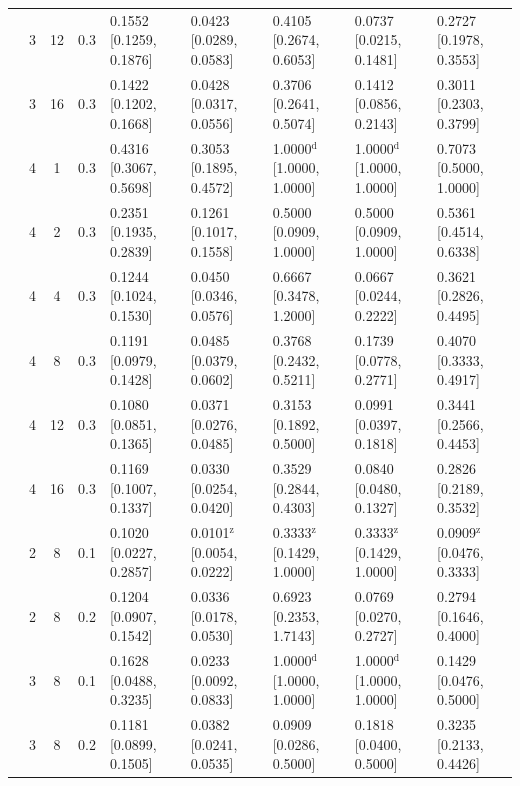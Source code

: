 \begin{tabular}{@{}cccclllll@{}}
 & 3 & 12 & 0.3 & 0.1552 {\tiny[0.1259, 0.1876]} & 0.0423 {\tiny[0.0289, 0.0583]} & 0.4105 {\tiny[0.2674, 0.6053]} & 0.0737 {\tiny[0.0215, 0.1481]} & 0.2727 {\tiny[0.1978, 0.3553]} \\
 & 3 & 16 & 0.3 & 0.1422 {\tiny[0.1202, 0.1668]} & 0.0428 {\tiny[0.0317, 0.0556]} & 0.3706 {\tiny[0.2641, 0.5074]} & 0.1412 {\tiny[0.0856, 0.2143]} & 0.3011 {\tiny[0.2303, 0.3799]} \\
 & 4 & 1 & 0.3 & 0.4316 {\tiny[0.3067, 0.5698]} & 0.3053 {\tiny[0.1895, 0.4572]} & 1.0000$^{\mathrm{d}}$ {\tiny[1.0000, 1.0000]} & 1.0000$^{\mathrm{d}}$ {\tiny[1.0000, 1.0000]} & 0.7073 {\tiny[0.5000, 1.0000]} \\
 & 4 & 2 & 0.3 & 0.2351 {\tiny[0.1935, 0.2839]} & 0.1261 {\tiny[0.1017, 0.1558]} & 0.5000 {\tiny[0.0909, 1.0000]} & 0.5000 {\tiny[0.0909, 1.0000]} & 0.5361 {\tiny[0.4514, 0.6338]} \\
 & 4 & 4 & 0.3 & 0.1244 {\tiny[0.1024, 0.1530]} & 0.0450 {\tiny[0.0346, 0.0576]} & 0.6667 {\tiny[0.3478, 1.2000]} & 0.0667 {\tiny[0.0244, 0.2222]} & 0.3621 {\tiny[0.2826, 0.4495]} \\
 & 4 & 8 & 0.3 & 0.1191 {\tiny[0.0979, 0.1428]} & 0.0485 {\tiny[0.0379, 0.0602]} & 0.3768 {\tiny[0.2432, 0.5211]} & 0.1739 {\tiny[0.0778, 0.2771]} & 0.4070 {\tiny[0.3333, 0.4917]} \\
 & 4 & 12 & 0.3 & 0.1080 {\tiny[0.0851, 0.1365]} & 0.0371 {\tiny[0.0276, 0.0485]} & 0.3153 {\tiny[0.1892, 0.5000]} & 0.0991 {\tiny[0.0397, 0.1818]} & 0.3441 {\tiny[0.2566, 0.4453]} \\
 & 4 & 16 & 0.3 & 0.1169 {\tiny[0.1007, 0.1337]} & 0.0330 {\tiny[0.0254, 0.0420]} & 0.3529 {\tiny[0.2844, 0.4303]} & 0.0840 {\tiny[0.0480, 0.1327]} & 0.2826 {\tiny[0.2189, 0.3532]} \\
 & 2 & 8 & 0.1 & 0.1020 {\tiny[0.0227, 0.2857]} & 0.0101$^{\mathrm{z}}$ {\tiny[0.0054, 0.0222]} & 0.3333$^{\mathrm{z}}$ {\tiny[0.1429, 1.0000]} & 0.3333$^{\mathrm{z}}$ {\tiny[0.1429, 1.0000]} & 0.0909$^{\mathrm{z}}$ {\tiny[0.0476, 0.3333]} \\
 & 2 & 8 & 0.2 & 0.1204 {\tiny[0.0907, 0.1542]} & 0.0336 {\tiny[0.0178, 0.0530]} & 0.6923 {\tiny[0.2353, 1.7143]} & 0.0769 {\tiny[0.0270, 0.2727]} & 0.2794 {\tiny[0.1646, 0.4000]} \\
 & 3 & 8 & 0.1 & 0.1628 {\tiny[0.0488, 0.3235]} & 0.0233 {\tiny[0.0092, 0.0833]} & 1.0000$^{\mathrm{d}}$ {\tiny[1.0000, 1.0000]} & 1.0000$^{\mathrm{d}}$ {\tiny[1.0000, 1.0000]} & 0.1429 {\tiny[0.0476, 0.5000]} \\
 & 3 & 8 & 0.2 & 0.1181 {\tiny[0.0899, 0.1505]} & 0.0382 {\tiny[0.0241, 0.0535]} & 0.0909 {\tiny[0.0286, 0.5000]} & 0.1818 {\tiny[0.0400, 0.5000]} & 0.3235 {\tiny[0.2133, 0.4426]} \\

\end{tabular}
